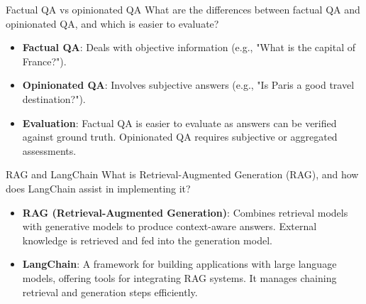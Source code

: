 \documentclass{article}
\begin{document}
\begin{exercise}{Factual QA vs opinionated QA}
  What are the differences between factual QA and opinionated QA, and which is easier to evaluate?

  \begin{solution}
    \begin{itemize}
        \item \textbf{Factual QA}: Deals with objective information (e.g., "What is the capital of France?").
        \item \textbf{Opinionated QA}: Involves subjective answers (e.g., "Is Paris a good travel destination?").
        \item \textbf{Evaluation}: Factual QA is easier to evaluate as answers can be verified against ground truth. Opinionated QA requires subjective or aggregated assessments.
    \end{itemize}
  \end{solution}
\end{exercise}

\begin{exercise}{RAG and LangChain}
  What is Retrieval-Augmented Generation (RAG), and how does LangChain assist in implementing it?

  \begin{solution}
    \begin{itemize}
        \item \textbf{RAG (Retrieval-Augmented Generation)}: Combines retrieval models with generative models to produce context-aware answers. External knowledge is retrieved and fed into the generation model.
        \item \textbf{LangChain}: A framework for building applications with large language models, offering tools for integrating RAG systems. It manages chaining retrieval and generation steps efficiently.
    \end{itemize}
  \end{solution}
\end{exercise}
\end{document}
